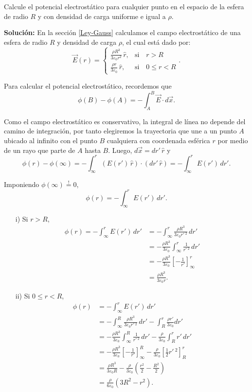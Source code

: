 \begin{ejemplo}
Calcule el potencial electrostático para cualquier punto en el espacio de la esfera de radio $R$ y con densidad de carga uniforme e igual a $\rho$.

\textbf{Solución:} En la sección \ref{Ley-Gauss} calculamos el campo electrostático de una esfera de radio $R$ y densidad de carga $\rho$, el cual está dado por:
$$\Vec{E}(r) = \left\{ \begin{array}{cl}
   \frac{\rho R^3 }{3\varepsilon_0 r^2} \,\hat{r},  & \text{si} \quad r > R  \\
    \frac{\rho r}{3\varepsilon_0} \,\hat{r}, & \text{si} \quad  0 \leq r < R 
\end{array} \right. .$$

Para calcular el potencial electrostático, recordemos que 
$$\phi(B) - \phi(A) = - \int_A^B \Vec{E} \cdot d\Vec{x}.$$

Como el campo electrostático es conservativo, la integral de línea no depende del camino de integración, por tanto elegiremos la trayectoria que une a un punto $A$ ubicado al infinito con el punto $B$ cualquiera con coordenada esférica $r$ por medio de  un rayo que parte de $A$ hasta $B$. Luego, $d\Vec{x} = dr'\,\hat{r}$ y
$$\phi(r) - \phi(\infty) = - \int_{\infty}^{r} (E(r') \,\hat{r}) \cdot (dr' \,\hat{r}) = -\int_{\infty}^r E(r') \,dr'.$$

Imponiendo $\phi(\infty) \stackrel{!}{=} 0$,
$$\phi(r) = - \int_{\infty}^r E(r') \,dr'.$$

\begin{itemize}
\item[i)] Si $r > R$, 
\begin{align*}
    \phi(r) = - \int_{\infty}^r E(r') \,dr' 
    &= - \int_{\infty}^r \frac{\rho R^3 }{3 \varepsilon_0 r'\,^2} \,  dr' \\
&= - \frac{\rho R^3}{3\varepsilon_0} \int_{\infty}^r \frac{1}{r'\,^2}\, dr' \\
&= - \frac{\rho R^3}{3\varepsilon_0} \left[ - \frac{1}{r'} \right]_{\infty}^r \\
&= \frac{\rho R^3}{3\varepsilon_0 r}.
\end{align*}

\item[ii)] Si $0 \leq r  < R$, 
\begin{align*}
    \phi(r) &= - \int_{\infty}^r E(r') \,dr' \\
    & = - \int_{\infty}^R \frac{\rho R^3}{3 \varepsilon_0 r'\,^2} \, dr' - \int_{R}^r \frac{\rho r'}{3 \varepsilon_0} dr' \\
&= - \frac{\rho R^3 }{3\varepsilon_0} \int_{\infty}^R \frac{1}{r'\,^2} \,dr' - \frac{\rho}{3\varepsilon_0} \int_R^r r' \,dr' \\
&= - \frac{\rho R^3}{3\varepsilon_0} \left[ -\frac{1}{r'} \right]_{\infty}^R - \frac{\rho}{3\varepsilon_0} \left[ \frac{1}{2}r'\,^2 \right]_R^r \\
&= \frac{\rho R^3}{3\varepsilon_0 R} - \frac{\rho}{3\varepsilon_0} \left( \frac{r^2}{2} - \frac{R^2}{2} \right) \\
&= \frac{\rho}{6 \varepsilon_0}(3R^2 - r^2).
\end{align*}


\end{itemize}
\end{ejemplo}
